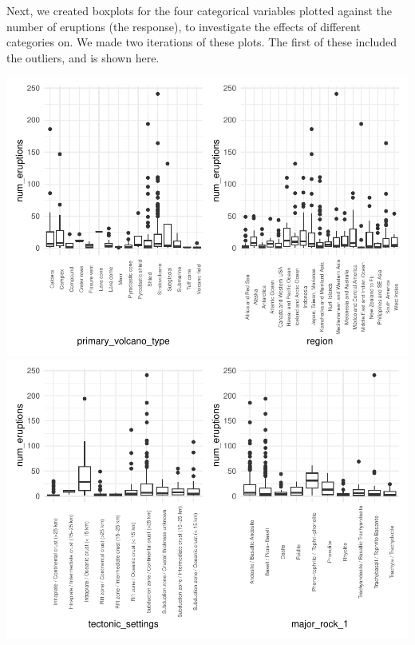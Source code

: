\documentclass[
  12pt,
]{article}
\begin{document}
Next, we created boxplots for the four categorical variables plotted
against the number of eruptions (the response), to investigate the
effects of different categories on. We made two iterations of these
plots. The first of these included the outliers, and is shown here.

\includegraphics{Report_files/figure-latex/unnamed-chunk-1-1.pdf}
\includegraphics{Report_files/figure-latex/unnamed-chunk-1-2.pdf}
\end{document}

